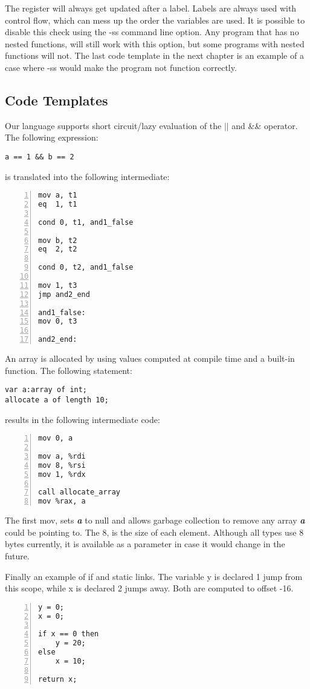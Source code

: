 \documentclass{article}
\begin{document}
The register will always get updated after a label. Labels are always used with control flow, which can mess up the order the variables are used. It is possible to disable this check using the -ss command line option. Any program that has no nested functions, will still work with this option, but some programs with nested functions will not. The last code template in the next chapter is an example of a case where -ss would make the program not function correctly. 

\subsection{Code Templates}
Our language supports short circuit/lazy evaluation of the $||$ and \&\& operator. The following expression:
\begin{lstlisting}
a == 1 && b == 2
\end{lstlisting}
is translated into the following intermediate:
\begin{lstlisting}[numbers=left, firstnumber=1]
mov a, t1
eq  1, t1

cond 0, t1, and1_false

mov b, t2
eq  2, t2

cond 0, t2, and1_false

mov 1, t3
jmp and2_end

and1_false:
mov 0, t3

and2_end:
\end{lstlisting}

An array is allocated by using values computed at compile time and a built-in function. The following statement:
\begin{lstlisting}
var a:array of int;
allocate a of length 10;
\end{lstlisting}
results in the following intermediate code:
\begin{lstlisting}[numbers=left, firstnumber=1]
mov 0, a

mov a, %rdi
mov 8, %rsi
mov 1, %rdx

call allocate_array
mov %rax, a
\end{lstlisting}
The first mov, sets \textit{\textbf{a}} to null and allows garbage collection to remove any array \textit{\textbf{a}} could be pointing to. The 8, is the size of each element. Although all types use 8 bytes currently, it is available as a parameter in case it would change in the future.

Finally an example of if and static links. The variable y is declared 1 jump from this scope, while x is declared 2 jumps away. Both are computed to offset -16.
\begin{lstlisting}[numbers=left, firstnumber=1]
y = 0;
x = 0;

if x == 0 then
    y = 20;
else
    x = 10;

return x;
\end{lstlisting}
\end{document}
